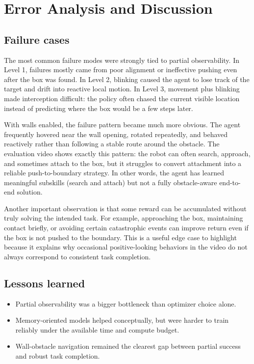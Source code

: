 \documentclass[11pt,oneside]{article}
\begin{document}
\section{Error Analysis and Discussion}
\subsection*{Failure cases}
The most common failure modes were strongly tied to partial observability. In Level 1, failures mostly came from poor alignment or ineffective pushing even after the box was found. In Level 2, blinking caused the agent to lose track of the target and drift into reactive local motion. In Level 3, movement plus blinking made interception difficult: the policy often chased the current visible location instead of predicting where the box would be a few steps later.

With walls enabled, the failure pattern became much more obvious. The agent frequently hovered near the wall opening, rotated repeatedly, and behaved reactively rather than following a stable route around the obstacle. The evaluation video shows exactly this pattern: the robot can often search, approach, and sometimes attach to the box, but it struggles to convert attachment into a reliable push-to-boundary strategy. In other words, the agent has learned meaningful subskills (search and attach) but not a fully obstacle-aware end-to-end solution.

Another important observation is that some reward can be accumulated without truly solving the intended task. For example, approaching the box, maintaining contact briefly, or avoiding certain catastrophic events can improve return even if the box is not pushed to the boundary. This is a useful edge case to highlight because it explains why occasional positive-looking behaviors in the video do not always correspond to consistent task completion.

\subsection*{Lessons learned}
\begin{itemize}[leftmargin=*]
\item Partial observability was a bigger bottleneck than optimizer choice alone.
\item Memory-oriented models helped conceptually, but were harder to train reliably under the available time and compute budget.
\item Wall-obstacle navigation remained the clearest gap between partial success and robust task completion.
\end{itemize}
\end{document}
